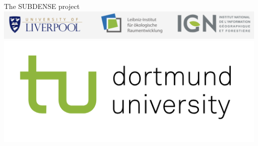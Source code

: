 \documentclass{beamer}
\begin{document}
\begin{frame}{The SUBDENSE project}
\includegraphics[height=0.1\textheight]{figures/logos.png}\hspace{-0.1cm}
\includegraphics[height=0.1\textheight]{figures/tud.png}



\end{frame}
\end{document}
